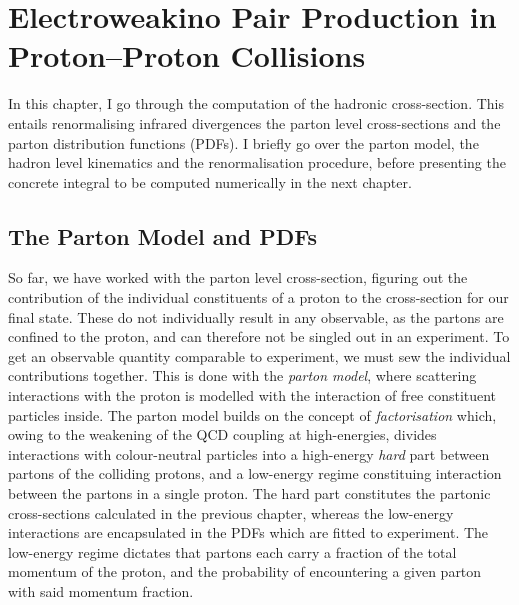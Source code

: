 \documentclass[../main.tex]{subfiles}
\begin{document}
\chapter{Electroweakino Pair Production in Proton--Proton Collisions}
\label{had:chap:hadron_calculation}
In this chapter, I go through the computation of the hadronic cross-section.
This entails renormalising infrared divergences the parton level cross-sections and the parton distribution functions (PDFs).
I briefly go over the parton model, the hadron level kinematics and the renormalisation procedure, before presenting the concrete integral to be computed numerically in the next chapter.


\section{The Parton Model and PDFs}
So far, we have worked with the parton level cross-section, figuring out the contribution of the individual constituents of a proton to the cross-section for our final state.
These do not individually result in any observable, as the partons are confined to the proton, and can therefore not be singled out in an experiment.
To get an observable quantity comparable to experiment, we must sew the individual contributions together.
This is done with the \emph{parton model}, where scattering interactions with the proton is modelled with the interaction of free constituent particles inside.
The parton model builds on the concept of \emph{factorisation} which, owing to the weakening of the QCD coupling at high-energies, divides interactions with colour-neutral particles into a high-energy \emph{hard} part between partons of the colliding protons, and a low-energy regime constituing interaction between the partons in a single proton.
The hard part constitutes the partonic cross-sections calculated in the previous chapter, whereas the low-energy interactions are encapsulated in the PDFs which are fitted to experiment.
The low-energy regime dictates that partons each carry a fraction of the total momentum of the proton, and the probability of encountering a given parton with said momentum fraction.
\end{document}
